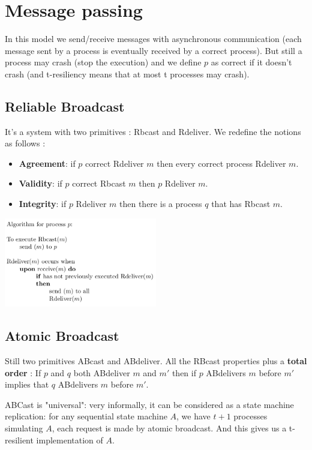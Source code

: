 \documentclass{article}
\theoremstyle{definition}
\begin{document}
\section{Message passing}

In this model we send/receive messages with asynchronous communication (each message sent by a process is eventually received by a correct process). But still a process may crash (stop the execution) and we define $p$ as correct if it doesn't crash (and t-resiliency means that at most t processes may crash).

\subsection{Reliable Broadcast}
It's a system with two primitives : Rbcast and Rdeliver. We redefine the notions as follows :
\begin{itemize}
\item \textbf{Agreement}: if $p$ correct Rdeliver $m$ then every correct process Rdeliver $m$.
\item \textbf{Validity}: if $p$ correct Rbcast $m$ then $p$ Rdeliver $m$.
\item  \textbf{Integrity}: if $p$ Rdeliver $m$ then there is a process $q$ that has Rbcast $m$.
\end{itemize}

\begin{center}
\includegraphics[width=0.5\textwidth]{RBcast}
\end{center}

\subsection{Atomic Broadcast}

Still two primitives ABcast and ABdeliver. All the RBcast properties plus a \textbf{total order} : If $p$ and $q$ both ABdeliver $m$ and $m'$ then if $p$ ABdelivers $m$ before $m'$ implies that $q$ ABdelivers $m$ before $m'$.


ABCast is "universal": very informally, it can be considered as a state machine replication: for any sequential state machine $A$, we have $t+1$ processes simulating $A$, each request is made by atomic broadcast. And this gives us a t-resilient implementation of $A$.
\end{document}
